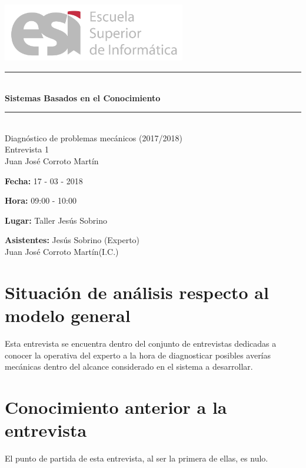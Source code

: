 \documentclass[a4paper,12pt]{article}
\newcommand\tab[1][1cm]{\hspace*{#1}}
\begin{document}
\begin{titlepage}
\begin{center}

\includegraphics[width=0.6\textwidth]{logoesi}\\[5cm]

\rule{\linewidth}{0.5mm} \\[0.4cm]
{ \huge \bfseries Sistemas Basados en el Conocimiento\\[0.4cm] }
\rule{\linewidth}{0.5mm} \\[1.5cm]
{\huge Diagnóstico de problemas mecánicos (2017/2018)\\Entrevista 1}\\[0.5cm]

\large{Juan Jos\'e Corroto Mart\'in}

\end{center}
\end{titlepage}

\tableofcontents
\newpage

\textbf{Fecha:} 17 - 03 - 2018

\textbf{Hora:} 09:00 - 10:00

\textbf{Lugar:} Taller Jesús Sobrino

\textbf{Asistentes:} Jesús Sobrino (Experto)\\ \tab \tab \tab Juan José Corroto Martín(I.C.) 

\section{Situación de análisis respecto al modelo general}
 Esta entrevista se encuentra dentro del conjunto de entrevistas dedicadas a conocer la operativa del experto a la hora de diagnosticar posibles averías mecánicas dentro del alcance considerado en el sistema a desarrollar. 
 
\section{Conocimiento anterior a la entrevista}
 El punto de partida de esta entrevista, al ser la primera de ellas, es nulo. 
 
\end{document}
